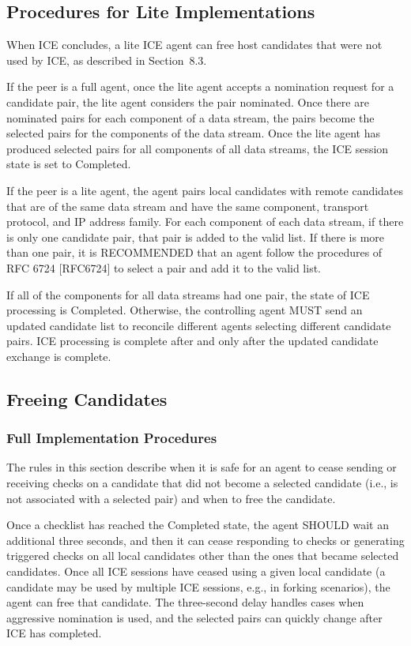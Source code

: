 \documentclass{article}
\begin{document}
\subsection{Procedures for Lite Implementations}

When ICE concludes, a lite ICE agent can free host candidates that were not used by ICE, as described in Section~8.3.

If the peer is a full agent, once the lite agent accepts a nomination request for a candidate pair, the lite agent considers the pair nominated.  Once there are nominated pairs for each component of a data stream, the pairs become the selected pairs for the components of the data stream.  Once the lite agent has produced selected pairs for all components of all data streams, the ICE session state is set to Completed.

If the peer is a lite agent, the agent pairs local candidates with remote candidates that are of the same data stream and have the same component, transport protocol, and IP address family.  For each component of each data stream, if there is only one candidate pair, that pair is added to the valid list.  If there is more than one pair, it is RECOMMENDED that an agent follow the procedures of RFC 6724 [RFC6724] to select a pair and add it to the valid list.

If all of the components for all data streams had one pair, the state of ICE processing is Completed.  Otherwise, the controlling agent MUST send an updated candidate list to reconcile different agents selecting different candidate pairs.  ICE processing is complete after and only after the updated candidate exchange is complete.

\subsection{Freeing Candidates}

\subsubsection{Full Implementation Procedures}

The rules in this section describe when it is safe for an agent to cease sending or receiving checks on a candidate that did not become a selected candidate (i.e., is not associated with a selected pair) and when to free the candidate.

Once a checklist has reached the Completed state, the agent SHOULD wait an additional three seconds, and then it can cease responding to checks or generating triggered checks on all local candidates other than the ones that became selected candidates.  Once all ICE sessions have ceased using a given local candidate (a candidate may be used by multiple ICE sessions, e.g., in forking scenarios), the agent can free that candidate.  The three-second delay handles cases when aggressive nomination is used, and the selected pairs can quickly change after ICE has completed.
\end{document}
